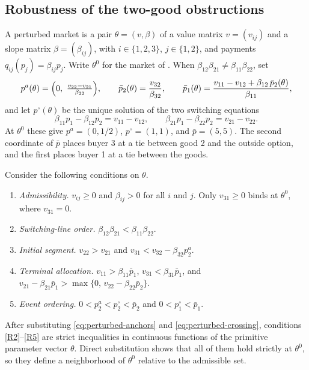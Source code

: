 \subsection*{Robustness of the two-good obstructions}

A perturbed market is a pair $\theta=(v,\beta)$ of a value matrix $v=(v_{ij})$ and a slope matrix $\beta=(\beta_{ij})$, with $i\in\{1,2,3\}$, $j\in\{1,2\}$, and payments $q_{ij}(p_j)=\beta_{ij}p_j$. Write $\theta^0$ for the market of . When $\beta_{12}\beta_{21}\ne\beta_{11}\beta_{22}$, set
\begin{equation}\label{eq:perturbed-anchors}
p^a(\theta)=\Bigl(0,\ \tfrac{v_{22}-v_{21}}{\beta_{22}}\Bigr),
\qquad
\bar p_2(\theta)=\frac{v_{32}}{\beta_{32}},
\qquad
\bar p_1(\theta)=\frac{v_{11}-v_{12}+\beta_{12}\,\bar p_2(\theta)}{\beta_{11}},
\end{equation}
and let $p^\circ(\theta)$ be the unique solution of the two switching equations
\begin{equation}\label{eq:perturbed-crossing}
\beta_{11}p_1-\beta_{12}p_2=v_{11}-v_{12},
\qquad
\beta_{21}p_1-\beta_{22}p_2=v_{21}-v_{22}.
\end{equation}
At $\theta^0$ these give $p^a=(0,1/2)$, $p^\circ=(1,1)$, and $\bar p=(5,5)$. The second coordinate of $\bar p$ places buyer 3 at a tie between good 2 and the outside option, and the first places buyer 1 at a tie between the goods.

Consider the following conditions on $\theta$.
\begin{enumerate}[label=\textup{(R\arabic*)},leftmargin=3.1em]
\item\label{R1} \emph{Admissibility.} $v_{ij}\ge0$ and $\beta_{ij}>0$ for all $i$ and $j$. Only $v_{31}\ge0$ binds at $\theta^0$, where $v_{31}=0$.
\item\label{R2} \emph{Switching-line order.} $\beta_{12}\beta_{21}<\beta_{11}\beta_{22}$.
\item\label{R3} \emph{Initial segment.} $v_{22}>v_{21}$ and $v_{31}<v_{32}-\beta_{32}p^a_2$.
\item\label{R4} \emph{Terminal allocation.} $v_{11}>\beta_{11}\bar p_1$, $v_{31}<\beta_{31}\bar p_1$, and $v_{21}-\beta_{21}\bar p_1>\max\{0,\,v_{22}-\beta_{22}\bar p_2\}$.
\item\label{R5} \emph{Event ordering.} $0<p^a_2<p^\circ_2<\bar p_2$ and $0<p^\circ_1<\bar p_1$.
\end{enumerate}
After substituting \eqref{eq:perturbed-anchors} and \eqref{eq:perturbed-crossing}, conditions \ref{R2}--\ref{R5} are strict inequalities in continuous functions of the primitive parameter vector $\theta$. Direct substitution shows that all of them hold strictly at $\theta^0$, so they define a neighborhood of $\theta^0$ relative to the admissible set.

